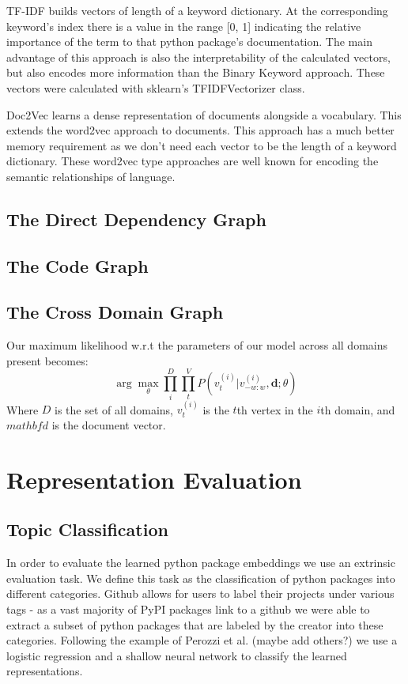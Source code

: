 \documentclass{article}
\begin{document}
 TF-IDF builds vectors of length of a keyword dictionary. At the corresponding keyword’s index there is a value in the range [0, 1] indicating the relative importance of the term to that python package’s documentation. The main advantage of this approach is also the interpretability of the calculated vectors, but also encodes more information than the Binary Keyword approach. These vectors were calculated with sklearn’s TFIDFVectorizer class.
 
 Doc2Vec \cite{doc2vec} learns a dense representation of documents alongside a vocabulary. This extends the word2vec \cite{word2vec} approach to documents. This approach has a much better memory requirement as we don’t need each vector to be the length of a keyword dictionary. These word2vec type approaches are well known for encoding the semantic relationships of language.

\subsection{The Direct Dependency Graph}

\subsection{The Code Graph}

\subsection{The Cross Domain Graph}
Our maximum likelihood w.r.t the parameters of our model across all domains present becomes:
\begin{equation}
\arg\max_{\theta} \prod_{i}^{D}\prod_{t}^{V}P(v^{(i)}_{t} | v^{(i)}_{-w:w}, \mathbf{d}; \theta)
\end{equation}
Where $D$ is the set of all domains, $v^{(i)}_{t}$ is the $t$th vertex in the $i$th domain, and $mathbf{d}$ is the document vector.

\section{Representation Evaluation}

\subsection{Topic Classification}
In order to evaluate the learned python package embeddings we use an extrinsic evaluation task. We define this task as the classification of python packages into different categories. Github allows for users to label their projects under various tags - as a vast majority of PyPI packages link to a github we were able to extract a subset of python packages that are labeled by the creator into these categories. Following the example of Perozzi et al. (maybe add others?) we use a logistic regression and a shallow neural network to classify the learned representations.
\end{document}
